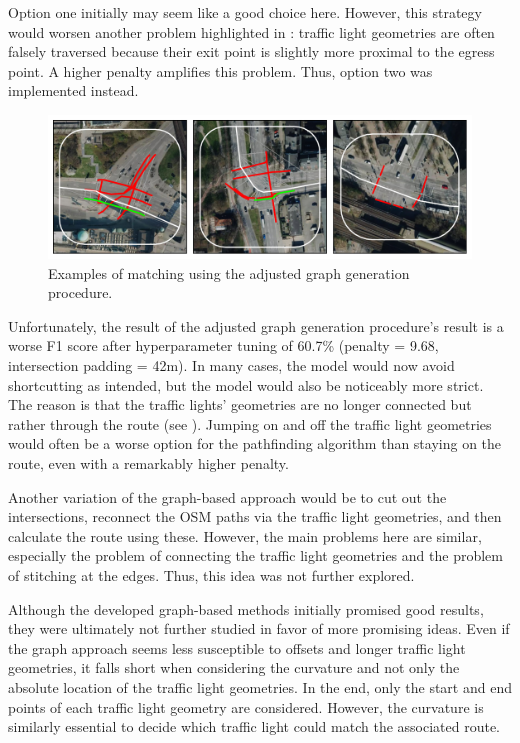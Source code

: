Option one initially may seem like a good choice here. However, this strategy would worsen another problem highlighted in : traffic light geometries are often falsely traversed because their exit point is slightly more proximal to the egress point. A higher penalty amplifies this problem. Thus, option two was implemented instead. 

\begin{figure}[t]
\centering
\includegraphics[width=\linewidth]{images/matching-dijkstra-strict.pdf}
\caption{Examples of matching using the adjusted graph generation procedure.}
\label{fig:sg-selection-graph-strict}
\end{figure}

Unfortunately, the result of the adjusted graph generation procedure's result is a worse F1 score after hyperparameter tuning of 60.7\% (penalty = 9.68, intersection padding = 42m). In many cases, the model would now avoid shortcutting as intended, but the model would also be noticeably more strict. The reason is that the traffic lights' geometries are no longer connected but rather through the route (see ). Jumping on and off the traffic light geometries would often be a worse option for the pathfinding algorithm than staying on the route, even with a remarkably higher penalty. 

Another variation of the graph-based approach would be to cut out the intersections, reconnect the OSM paths via the traffic light geometries, and then calculate the route using these. However, the main problems here are similar, especially the problem of connecting the traffic light geometries and the problem of stitching at the edges. Thus, this idea was not further explored.

Although the developed graph-based methods initially promised good results, they were ultimately not further studied in favor of more promising ideas. Even if the graph approach seems less susceptible to offsets and longer traffic light geometries, it falls short when considering the curvature and not only the absolute location of the traffic light geometries. In the end, only the start and end points of each traffic light geometry are considered. However, the curvature is similarly essential to decide which traffic light could match the associated route.

